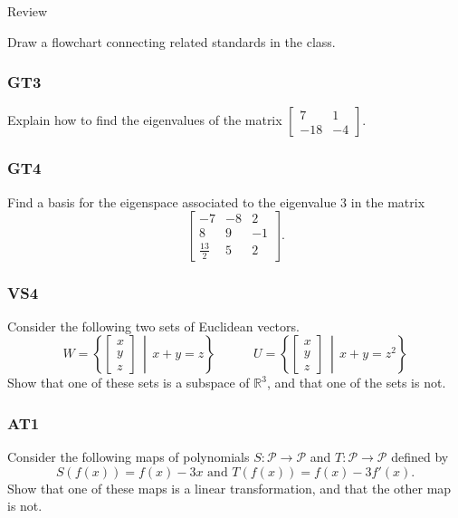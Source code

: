 \documentclass[aspectratio=1610]{beamer}
\newcommand{\IR}{\mathbb{R}}
\renewcommand{\P}{\mathcal{P}}
\newcommand{\setBuilder}[2]{\left\{#1\,\middle|\,#2\right\}}
\begin{document}
\begin{frame}
\begin{center}
\Large Review
\end{center}
\end{frame}

\begin{frame}
Draw a flowchart connecting related standards in the class.
\end{frame}

\begin{frame}\frametitle{GT3}
Explain how to find the eigenvalues of the matrix \(\left[\begin{array}{cc}
7 & 1 \\
-18 & -4
\end{array}\right]\).
\end{frame}

\begin{frame}\frametitle{GT4}
Find a basis for the eigenspace associated to the eigenvalue $3$ in the matrix \[\begin{bmatrix} -7 & -8 & 2 \\ 8 & 9 & -1 \\ \frac{13}{2} & 5 & 2 \end{bmatrix}.\]
\end{frame}


\begin{frame}\frametitle{VS4}
Consider the following two sets of Euclidean vectors.
\[
  W = \setBuilder{\begin{bmatrix} x \\ y \\ z \end{bmatrix}}{x+y=z}
\hspace{3em}
  U = \setBuilder{\begin{bmatrix} x \\ y \\ z \end{bmatrix}}{x+y=z^2}
\]
Show that one of these sets is a subspace of \(\IR^3\), and
that one of the sets is not.

\end{frame}

\begin{frame}\frametitle{AT1}
Consider the following maps of polynomials \(S: \P \rightarrow \P\)
and \(T:\P\rightarrow\P\) defined by
\[S(f(x))= f(x)-3x \text{ and }T(f(x)) = f(x)-3f'(x).\]
Show that one of these maps is a linear transformation, and that the other
map is not.
\end{frame}
\end{document}
